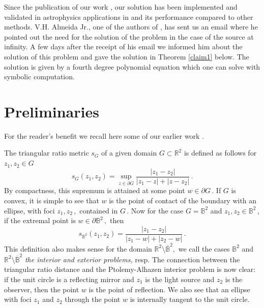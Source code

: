\documentclass[12pt,a4paper]{amsart}
\theoremstyle{plain}
\theoremstyle{definition}
\theoremstyle{remark}
\numberwithin{equation}{section}
\begin{document}
Since the publication of our work \cite{fhmv}, our solution has been implemented and validated in astrophysics applications in \cite{dg1, dg2} and its performance compared to other methods.  V.H.  Almeida Jr., one of the authors of \cite{dg1,dg2},
has sent us an email \cite{d} where he pointed out the need for the solution of the problem in the case of the source at
infinity. A few days after the receipt of his email we informed him about the solution of this
problem and gave the solution in Theorem \ref{claim1} below. The solution
is given by a fourth degree polynomial equation which one can solve with symbolic
computation.


 
 \section{Preliminaries}

For the reader's benefit we recall here some of our earlier
work \cite{fhmv, hkv}. 
 

The triangular
ratio metric $s_G$ of a given domain $G \subset {\mathbb{R}}^2$ is defined as
follows for $z_1,z_2 \in G$ \cite{hkv}
\begin{equation*}  %
  s_G(z_1,z_2)= \sup_{z \in \partial G} \frac{|z_1-z_2|}{|z_1-z|+|z-z_2|} \, .
\end{equation*}
By compactness, this supremum is attained at some point $w \in \partial
G\,.$ If $G$ is convex, it is simple to see that $w$ is the point of
contact of the boundary with an ellipse, with foci $z_1,z_2\,,$ contained in
$G\,.$ Now for the case $G= \mathbb{B}^2$ and $z_1,z_2 \in \mathbb{B}^2\,$, if the extremal point is $w
\in \partial \mathbb{B}^2\,,$  then
\begin{equation} \label{extrpt}
  s_{\mathbb{B}^2}(z_1, z_2) = \frac{|z_1- z_2|}{ |z_1- w| + |z_2-w| } \,.
\end{equation}
This definition also makes sense for the domain $\mathbb{R}^2 \setminus \overline{\mathbb{B}}^2,$ we call the cases 
$\mathbb{B}^2$ and $\mathbb{R}^2 \setminus \overline{\mathbb{B}}^2$ {\it the interior and exterior problems,} resp. 
The connection between the triangular ratio
distance
and the Ptolemy-Alhazen interior problem is now clear: if the unit circle is a reflecting mirror and $z_1$ is the light source and $z_2$ is the observer, then the point $w$ is the point of reflection.
We also see that an ellipse with foci $z_1$ and $z_2$ through
the point $w$ is internally tangent to the unit circle.
\end{document}
